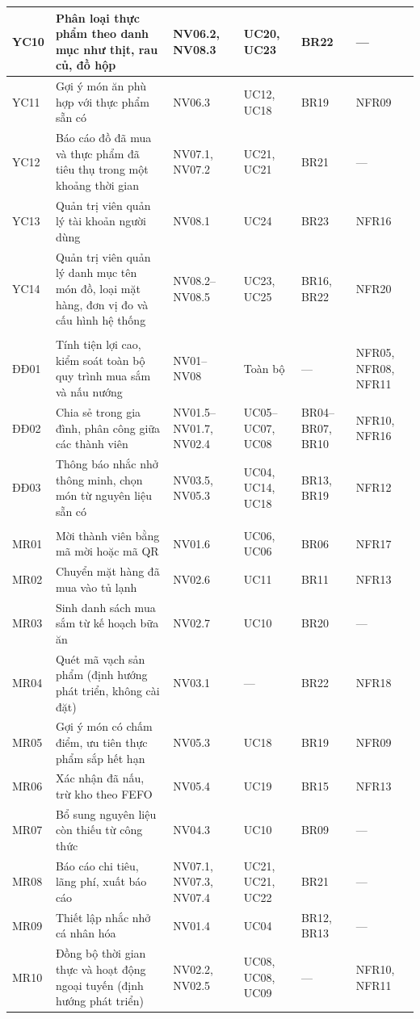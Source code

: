 {\begin{longtable}{|C{1.2cm}|L{\dimexpr{}\arrayrulewidth-1.2cm-2.0cm-2.6cm-1.9cm-1.7cm\relax}|L{2.0cm}|L{2.6cm}|L{1.9cm}|L{1.7cm}|}
YC10 & Phân loại thực phẩm theo danh mục như thịt, rau củ, đồ hộp & NV06.2, NV08.3 & UC20, UC23 & BR22 & —\\ \hline
YC11 & Gợi ý món ăn phù hợp với thực phẩm sẵn có & NV06.3 & UC12, UC18 & BR19 & NFR09\\ \hline
YC12 & Báo cáo đồ đã mua và thực phẩm đã tiêu thụ trong một khoảng thời gian & NV07.1, NV07.2 & UC21, UC21 & BR21 & —\\ \hline
YC13 & Quản trị viên quản lý tài khoản người dùng & NV08.1 & UC24 & BR23 & NFR16\\ \hline
YC14 & Quản trị viên quản lý danh mục tên món đồ, loại mặt hàng, đơn vị đo và cấu hình hệ thống & NV08.2–NV08.5 & UC23, UC25 & BR16, BR22 & NFR20\\ \hline
{}\\ \hline
ĐĐ01 & Tính tiện lợi cao, kiểm soát toàn bộ quy trình mua sắm và nấu nướng & NV01–NV08 & Toàn bộ & — & NFR05, NFR08, NFR11\\ \hline
ĐĐ02 & Chia sẻ trong gia đình, phân công giữa các thành viên & NV01.5–NV01.7, NV02.4 & UC05--UC07, UC08 & BR04–BR07, BR10 & NFR10, NFR16\\ \hline
ĐĐ03 & Thông báo nhắc nhở thông minh, chọn món từ nguyên liệu sẵn có & NV03.5, NV05.3 & UC04, UC14, UC18 & BR13, BR19 & NFR12\\ \hline
{}\\ \hline
MR01 & Mời thành viên bằng mã mời hoặc mã QR & NV01.6 & UC06, UC06 & BR06 & NFR17\\ \hline
MR02 & Chuyển mặt hàng đã mua vào tủ lạnh & NV02.6 & UC11 & BR11 & NFR13\\ \hline
MR03 & Sinh danh sách mua sắm từ kế hoạch bữa ăn & NV02.7 & UC10 & BR20 & —\\ \hline
MR04 & Quét mã vạch sản phẩm (định hướng phát triển, không cài đặt) & NV03.1 & — & BR22 & NFR18\\ \hline
MR05 & Gợi ý món có chấm điểm, ưu tiên thực phẩm sắp hết hạn & NV05.3 & UC18 & BR19 & NFR09\\ \hline
MR06 & Xác nhận đã nấu, trừ kho theo FEFO & NV05.4 & UC19 & BR15 & NFR13\\ \hline
MR07 & Bổ sung nguyên liệu còn thiếu từ công thức & NV04.3 & UC10 & BR09 & —\\ \hline
MR08 & Báo cáo chi tiêu, lãng phí, xuất báo cáo & NV07.1, NV07.3, NV07.4 & UC21, UC21, UC22 & BR21 & —\\ \hline
MR09 & Thiết lập nhắc nhở cá nhân hóa & NV01.4 & UC04 & BR12, BR13 & —\\ \hline
MR10 & Đồng bộ thời gian thực và hoạt động ngoại tuyến (định hướng phát triển) & NV02.2, NV02.5 & UC08, UC08, UC09 & — & NFR10, NFR11\\ \hline
\end{longtable}
}

